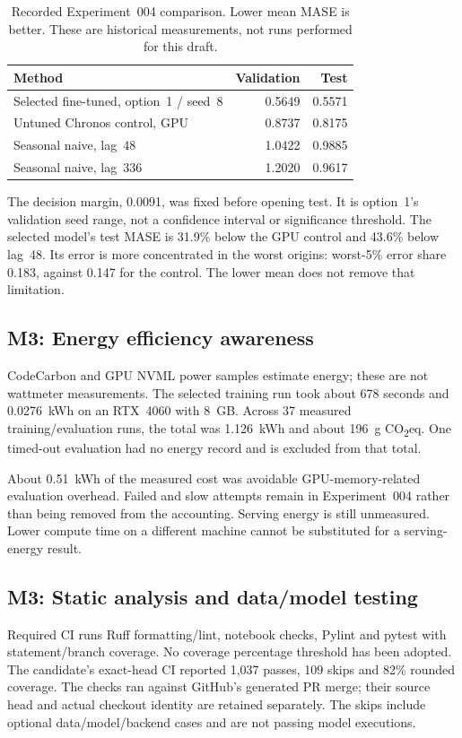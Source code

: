\documentclass[a4paper,11pt]{article}
\begin{document}
\begin{table}[ht]\centering
\caption{Recorded Experiment~004 comparison. Lower mean MASE is better. These
are historical measurements, not runs performed for this draft.}
\begin{tabular}{lrr}\toprule
Method & Validation & Test \\\midrule
Selected fine-tuned, option~1 / seed~8 & 0.5649 & 0.5571 \\
Untuned Chronos control, GPU & 0.8737 & 0.8175 \\
Seasonal naive, lag~48 & 1.0422 & 0.9885 \\
Seasonal naive, lag~336 & 1.2020 & 0.9617 \\\bottomrule
\end{tabular}\end{table}

The decision margin, 0.0091, was fixed before opening test. It is option~1's
validation seed range, not a confidence interval or significance threshold. The
selected model's test MASE is 31.9\% below the GPU control and 43.6\% below lag~48.
Its error is more concentrated in the worst origins: worst-5\% error share 0.183,
against 0.147 for the control. The lower mean does not remove that limitation.

\subsection{M3: Energy efficiency awareness}

CodeCarbon and GPU NVML power samples estimate energy; these are not wattmeter
measurements. The selected training run took about 678 seconds and 0.0276~kWh
on an RTX~4060 with 8~GB. Across 37 measured training/evaluation runs, the total
was 1.126~kWh and about 196~g CO\textsubscript{2}eq. One timed-out evaluation had
no energy record and is excluded from that total.

About 0.51~kWh of the measured cost was avoidable GPU-memory-related evaluation
overhead. Failed and slow attempts remain in Experiment~004 rather than being
removed from the accounting. Serving energy is still unmeasured. Lower compute
time on a different machine cannot be substituted for a serving-energy result.

\subsection{M3: Static analysis and data/model testing}

Required CI runs Ruff formatting/lint, notebook checks, Pylint and pytest with
statement/branch coverage. No coverage percentage threshold has been adopted.
The candidate's exact-head CI reported 1,037 passes, 109 skips and 82\% rounded
coverage. The checks ran against GitHub's generated PR merge; their source head
and actual checkout identity are retained separately. The skips include optional
data/model/backend cases and are not passing model executions.
\end{document}
